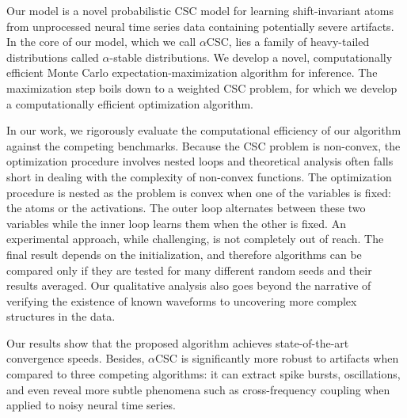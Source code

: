 Our model is a novel probabilistic \ac{CSC} model for learning shift-invariant atoms from unprocessed neural time series data containing
potentially severe artifacts.
In the core of our model, which we call $\alpha$CSC, lies a family of heavy-tailed
distributions called $\alpha$-stable distributions. We develop a novel, computationally efficient Monte Carlo
expectation-maximization algorithm for inference. The maximization step boils down to a weighted
\ac{CSC} problem, for which we develop a computationally efficient optimization algorithm.

In our work, we rigorously evaluate the computational efficiency of our algorithm against the competing benchmarks. Because the \ac{CSC} problem is non-convex, the optimization procedure involves nested loops and theoretical analysis often falls short in dealing with the complexity of non-convex functions. 
The optimization procedure is nested as the problem is convex when one of the variables is fixed: the atoms or the activations. The outer loop alternates between these two variables while the inner loop learns them when the other is fixed. An experimental approach, while challenging, is not completely out of reach. The final result depends on the initialization, and therefore algorithms can be compared only if they are tested for many different random seeds and their results averaged. Our qualitative analysis also goes beyond the narrative of verifying the existence of known waveforms to uncovering more complex structures in the data.

Our results
show that the proposed algorithm achieves state-of-the-art convergence speeds. Besides, $\alpha$CSC is
significantly more robust to artifacts when compared to three competing algorithms: it can extract
spike bursts, oscillations, and even reveal more subtle phenomena such as cross-frequency coupling
when applied to noisy neural time series.

